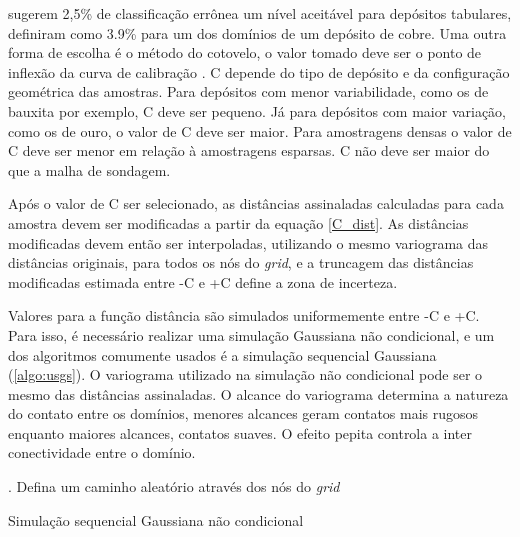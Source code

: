  sugerem 2,5\% de classificação errônea um nível aceitável para depósitos tabulares, \cite{martin2017implicitmodeling} definiram como 3.9\% para um dos domínios de um depósito de cobre. Uma outra forma de escolha é o método do cotovelo, o valor tomado deve ser o ponto de inflexão da curva de calibração \cite{martin2017implicitmodeling}. C depende do tipo de depósito e da configuração geométrica das amostras. Para depósitos com menor variabilidade, como os de bauxita por exemplo, C deve ser pequeno. Já para depósitos com maior variação, como os de ouro, o valor de C deve ser maior. Para amostragens densas o valor de C deve ser menor em relação à amostragens esparsas. C não deve ser maior do que a malha de sondagem.

Após o valor de C ser selecionado, as distâncias assinaladas calculadas para cada amostra devem ser modificadas a partir da equação \autoref{C_dist}. As distâncias modificadas devem então ser interpoladas, utilizando o mesmo variograma das distâncias originais, para todos os nós do \textit{grid}, e a truncagem das distâncias modificadas estimada entre -C e +C define a zona de incerteza.

Valores para a função distância são simulados uniformemente entre -C e +C. Para isso, é necessário realizar uma simulação Gaussiana não condicional, e um dos algoritmos comumente usados é a simulação sequencial Gaussiana (\autoref{algo:usgs}). O variograma utilizado na simulação não condicional pode ser o mesmo das distâncias assinaladas. O alcance do variograma determina a natureza do contato entre os domínios, menores alcances geram contatos mais rugosos enquanto maiores alcances, contatos suaves. O efeito pepita controla a inter conectividade entre o domínio.

\begin{algorithm}
. Defina um caminho aleatório através dos nós do \textit{grid}\;
 \caption{Simulação sequencial Gaussiana não condicional}\label{algo:usgs}
\end{algorithm}

